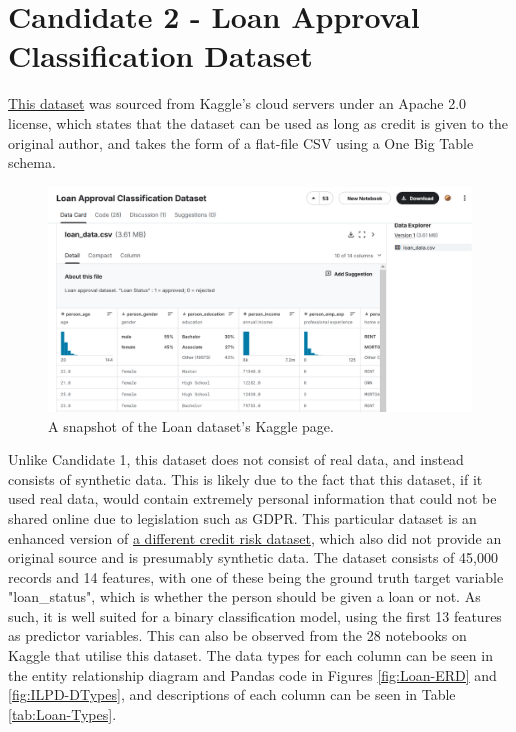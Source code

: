 \documentclass[12pt]{report}
\begin{document}
\section{Candidate 2 - Loan Approval Classification Dataset}\label{sec:Dataset}
\href{https://www.kaggle.com/datasets/taweilo/loan-approval-classification-data}{This dataset} was sourced from Kaggle's cloud servers under 
an Apache 2.0 license, which states that the dataset can be used as long as credit is given to the original author,
and takes the form of a flat-file CSV using a One Big Table schema. 

\begin{figure}[H]
    \centering
    \includegraphics[width=.75\linewidth]{Loan-Kaggle.png}
    \caption{A snapshot of the Loan dataset's Kaggle page.}
    \label{fig:Loan-Kaggle}
\end{figure}

Unlike Candidate 1, this dataset does not consist of real data, and 
instead consists of synthetic data. This is likely due to the fact that this dataset, if it used real data, would contain extremely personal 
information that could not be shared online due to legislation such as GDPR. This particular dataset is an enhanced version of \href{https://www.kaggle.com/datasets/laotse/credit-risk-dataset}{a different credit risk dataset},
which also did not provide an original source and is presumably synthetic data. The dataset consists of 45,000 records and 14 features, with 
one of these being the ground truth target variable "loan\_status", which is whether the person should be given a loan or not. As such, it is well suited 
for a binary classification model, using the first 13 features as predictor variables. This can also be observed from the 28 notebooks on Kaggle that 
utilise this dataset. The data types for each column can be seen in the entity relationship diagram and Pandas code in Figures \ref{fig:Loan-ERD} and \ref{fig:ILPD-DTypes}, and 
descriptions of each column can be seen in Table \ref{tab:Loan-Types}.
\end{document}
